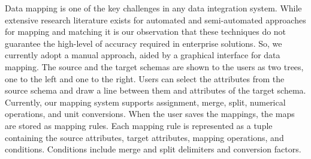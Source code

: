 Data mapping is one of the key challenges in any data integration system. While extensive research literature exists for automated and semi-automated approaches for mapping and matching \cite{mapping1,mapping2}
it is our observation that these techniques do not guarantee the high-level of accuracy required in enterprise solutions. So, we currently adopt a manual approach, aided by a graphical interface for data mapping. The source and 
the target schemas are shown to the users as two trees, one to the left and one to the right. Users can select the attributes from the source schema and draw a line between them and attributes of the target schema. Currently, our
mapping system supports assignment, merge, split, numerical operations, and unit conversions. When the user saves the mappings, the maps are stored as mapping rules. Each mapping rule is represented as a tuple containing the 
source attributes, target attributes, mapping operations, and conditions. Conditions include merge and split delimiters and conversion factors.  

